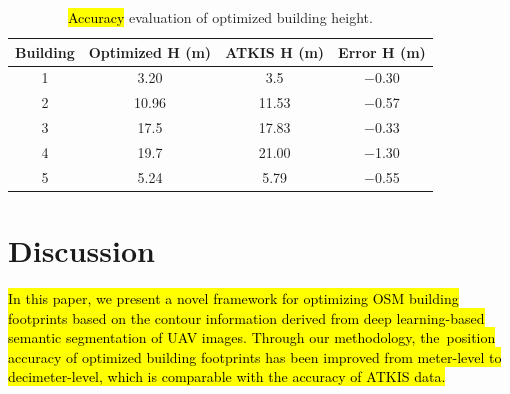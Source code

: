 \documentclass[remotesensing,article,accept,moreauthors,pdftex,10pt,a4paper]{mdpi}
\theoremstyle{mdpi}
\newcounter{ex}
\newcounter{re}
\begin{document}
\begin{table}[H]
  \centering
  \caption{\hl{Accuracy} %
  evaluation of optimized building height.}
    \begin{tabular}{cccc}
    \toprule
    \textbf{Building} & \textbf{Optimized H (m)} & \textbf{ATKIS H (m)} & \textbf{Error H (m)} \\
          
    \midrule
    1     & 3.20  & 3.5   & $-$0.30\\
    2     & 10.96 & 11.53 & $-$0.57 \\
    3     & 17.5  & 17.83 & $-$0.33  \\
    4     & 19.7  & 21.00 & $-$1.30  \\
    5     & 5.24  & 5.79 & $-$0.55  \\
    \bottomrule
    \end{tabular}%
  \label{tab:error_h}%
\end{table}%












\section{Discussion}\label{sec:conclu}
\hl{In this paper, we present a novel framework for optimizing OSM building footprints based on the contour information derived from deep learning-based semantic segmentation of UAV images. Through our methodology, the~position accuracy of optimized building footprints has been improved from meter-level to decimeter-level, which is comparable with the accuracy of ATKIS data.}
\end{document}
